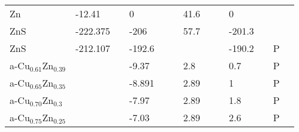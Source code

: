 \documentclass{article}
\begin{document}
\begin{center}
\begin{longtable}{|l|p{2.5cm}|l|p{2.5cm}|l|l|p{2.5cm}|l|l|p{2.5cm}|l|l|l|}
Zn               	   & -12.41                     & \citep{Barin1977} & 0                   &     & \citep{Haynes2013}     & 41.6               &     & \citep{Haynes2013} & 0                                   &     & \citep{Haynes2013} &  \\
ZnS              	   & -222.375                   & \citep{Barin1977} & -206                &     & \citep{Haynes2013}     & 57.7               &     & \citep{Haynes2013} & -201.3                              &     & \citep{Haynes2013} &  \\
ZnS              	   & -212.107                   & \citep{Barin1977} & -192.6              &     & \citep{Haynes2013}     &                    &     &     & -190.2                              &     & P   &  \\
a-Cu$_{0.61}$Zn$_{0.39}$   &                            &     & -9.37               &     & \citep{KubaschewskiCatterallJohnAshley.1956}     & 2.8                &     & \citep{KubaschewskiCatterallJohnAshley.1956} & 0.7                                &     & P   &  \\
a-Cu$_{0.65}$Zn$_{0.35}$   &                            &     & -8.891              &     & \citep{KubaschewskiCatterallJohnAshley.1956}     & 2.89               &     & \citep{KubaschewskiCatterallJohnAshley.1956} & 1                                   &     & P   &  \\
a-Cu$_{0.70}$Zn$_{0.3 }$   &                            &     & -7.97               &     & \citep{KubaschewskiCatterallJohnAshley.1956}     & 2.89               &     & \citep{KubaschewskiCatterallJohnAshley.1956} & 1.8                                 &     & P   &  \\
a-Cu$_{0.75}$Zn$_{0.25}$   &                            &     & -7.03               &     & \citep{KubaschewskiCatterallJohnAshley.1956}     & 2.89               &     & \citep{KubaschewskiCatterallJohnAshley.1956} & 2.6                                 &     & P   &  \\

\end{longtable}
\end{center}
\end{document}
